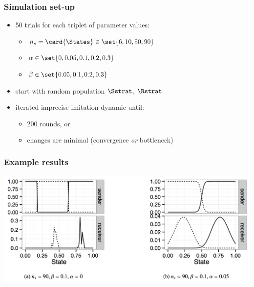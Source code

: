 \documentclass[fleqn,9pt,xcolor=dvipsnames]{beamer}
\newcommand{\imprecision}{\ensuremath{\alpha}} %
\newcommand{\toler}{\ensuremath{\beta}} %
\newcommand{\ns}{\ensuremath{n_s}} %
\begin{document}
\begin{frame}
  \frametitle{Simulation set-up}
  
  \begin{itemize}
  \item 50 trials for each triplet of parameter values:
    \begin{itemize}
    \item $\ns = \card{\States} \in \set{6, 10, 50, 90}$
    \item $\imprecision \in \set{0, 0.05, 0.1, 0.2, 0.3}$
    \item $\toler \in \set{0.05, 0.1, 0.2, 0.3}$
    \end{itemize}
  \item start with random population $\Sstrat$, $\Rstrat$
  \item iterated imprecise imitation dynamic until:
    \begin{itemize}
    \item 200 rounds, or
    \item changes are minimal \hfill (convergence \emph{or} bottleneck)
    \end{itemize}


  \end{itemize}

\end{frame}

\begin{frame}
  \frametitle{Example results}
  
  \centering

  \includegraphics[width=\textwidth]{plots/exampleStrats.png}

\end{frame}
\end{document}
